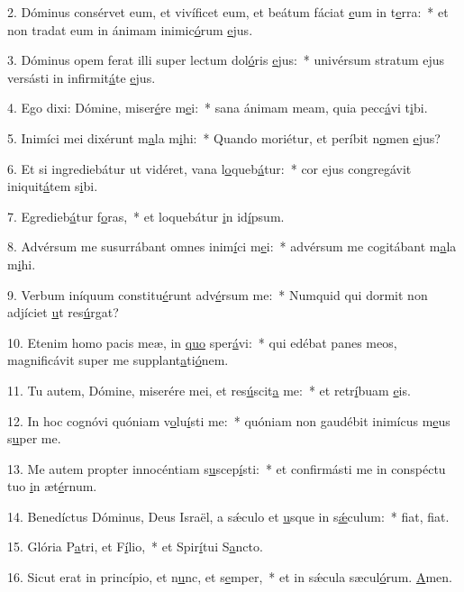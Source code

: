 2. Dóminus consérvet eum, et vivíficet eum, et beátum fáciat \uline{e}um in t\uline{e}rra:~* et non tradat eum in ánimam inimic\uline{ó}rum \uline{e}jus.\par 
3. Dóminus opem ferat illi super lectum dol\uline{ó}ris \uline{e}jus:~* univérsum stratum ejus versásti in infirmit\uline{á}te \uline{e}jus.\par 
4. Ego dixi: Dómine, miser\uline{é}re m\uline{e}i:~* sana ánimam meam, quia pecc\uline{á}vi t\uline{i}bi.\par 
5. Inimíci mei dixérunt m\uline{a}la m\uline{i}hi:~* Quando moriétur, et períbit n\uline{o}men \uline{e}jus?\par 
6. Et si ingrediebátur ut vidéret, vana l\uline{o}queb\uline{á}tur:~* cor ejus congregávit iniquit\uline{á}tem s\uline{i}bi.\par 
7. Egredieb\uline{á}tur f\uline{o}ras,~* et loquebátur \uline{i}n id\uline{í}psum.\par 
8. Advérsum me susurrábant omnes inim\uline{í}ci m\uline{e}i:~* advérsum me cogitábant m\uline{a}la m\uline{i}hi.\par 
9. Verbum iníquum constitu\uline{é}runt adv\uline{é}rsum me:~* Numquid qui dormit non adjíciet \uline{u}t res\uline{ú}rgat?\par 
10. Etenim homo pacis meæ, in \uline{quo} sper\uline{á}vi:~* qui edébat panes meos, magnificávit super me supplant\uline{a}ti\uline{ó}nem.\par 
11. Tu autem, Dómine, miserére mei, et res\uline{ú}scit\uline{a} me:~* et retr\uline{í}buam \uline{e}is.\par 
12. In hoc cognóvi quóniam v\uline{o}lu\uline{í}sti me:~* quóniam non gaudébit inimícus m\uline{e}us s\uline{u}per me.\par 
13. Me autem propter innocéntiam s\uline{u}scep\uline{í}sti:~* et confirmásti me in conspéctu tuo \uline{i}n æt\uline{é}rnum.\par 
14. Benedíctus Dóminus, Deus Israël, a sǽculo et \uline{u}sque in s\uline{ǽ}culum:~* f\uline{i}at, f\uline{i}at.\par 
15. Glória P\uline{a}tri, et F\uline{í}lio,~* et Spir\uline{í}tui S\uline{a}ncto.\par 
16. Sicut erat in princípio, et n\uline{u}nc, et s\uline{e}mper,~* et in sǽcula sæcul\uline{ó}rum. \uline{A}men.\par 
